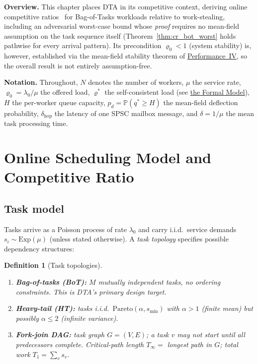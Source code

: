 \documentclass[11pt,a4paper]{report}
\newtheorem{definition}{Definition}[section]
\begin{document}
\bigskip
\noindent\textbf{Overview.}
This chapter places DTA in its competitive context, deriving online
competitive ratios~\cite{borodin_elyaniv1998,borodin1996} for
Bag-of-Tasks workloads relative to work-stealing, including an
adversarial worst-case bound whose \emph{proof} requires no
mean-field assumption on the task sequence itself
(Theorem~\ref{thm:cr_bot_worst} holds pathwise for every arrival
pattern). Its precondition $\varrho_0 < 1$ (system stability) is,
however, established via the mean-field stability theorem of
\hyperref[chap:stability]{Performance~IV}, so the overall result is
not entirely assumption-free.

\textbf{Notation.}
Throughout, $N$ denotes the number of workers, $\mu$ the service rate,
$\varrho_0 = \lambda_0/\mu$ the offered load, $\varrho^*$ the self-consistent
load (see \hyperref[chap:formal_model]{the Formal Model}), $H$ the per-worker queue capacity,
$p_d = \mathbb{P}(q^* \ge H)$ the mean-field deflection probability,
$\delta_{\mathrm{hop}}$ the latency of one SPSC mailbox message, and
$\delta = 1/\mu$ the mean task processing time.

\section{Online Scheduling Model and Competitive Ratio}

\subsection{Task model}

Tasks arrive as a Poisson process of rate $\lambda_0$ and carry i.i.d.\
service demands $s_i \sim \mathrm{Exp}(\mu)$ (unless stated otherwise).
A \emph{task topology} specifies possible dependency structures:

\begin{definition}[Task topologies]
\begin{enumerate}
  \item \textbf{Bag-of-tasks (BoT):} $M$ mutually independent tasks,
        no ordering constraints.  This is DTA's primary design target.
  \item \textbf{Heavy-tail (HT):} tasks i.i.d.\ $\mathrm{Pareto}(\alpha, s_{\min})$
        with $\alpha > 1$ (finite mean) but possibly $\alpha \le 2$ (infinite variance).
  \item \textbf{Fork-join DAG:} task graph $G=(V,E)$; a task $v$ may not
        start until all predecessors complete.  Critical-path length
        $T_\infty = $ longest path in $G$; total work $T_1 = \sum_{v} s_v$.
\end{enumerate}
\end{definition}
\end{document}
